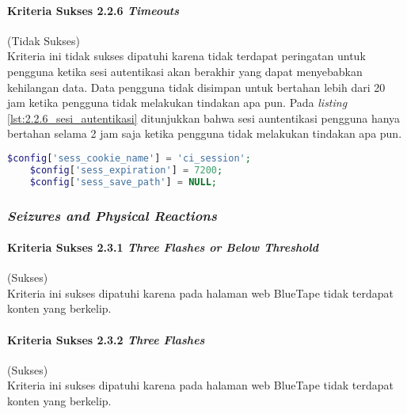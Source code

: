 \paragraph{Kriteria Sukses 2.2.6 \textit{Timeouts}}
\label{par:kepatuhan_bluetape_kriteria_sukses_2.2.6}
(Tidak Sukses)\\

Kriteria ini tidak sukses dipatuhi karena tidak terdapat peringatan untuk pengguna ketika sesi autentikasi akan berakhir yang dapat menyebabkan kehilangan data. Data pengguna tidak disimpan untuk bertahan lebih dari 20 jam ketika pengguna tidak melakukan tindakan apa pun. Pada \textit{listing} \ref{lst:2.2.6_sesi_autentikasi} ditunjukkan bahwa sesi auntentikasi pengguna hanya bertahan selama 2 jam saja ketika pengguna tidak melakukan tindakan apa pun.

\begin{lstlisting}[frame=single, label={lst:2.2.6_sesi_autentikasi}, language=PHP, caption=Pelanggaran Kriteria Sukses 2.2.6 pada Bagian Sesi Autentikasi]
    $config['sess_cookie_name'] = 'ci_session';
    $config['sess_expiration'] = 7200;
    $config['sess_save_path'] = NULL;
\end{lstlisting}

\subsubsection{\textit{Seizures and Physical Reactions}}
\label{subsubsec:kepatuhan_bluetape_seizures_and_physical_reactions}

\paragraph{Kriteria Sukses 2.3.1 \textit{Three Flashes or Below Threshold}}
\label{par:kepatuhan_bluetape_kriteria_sukses_2.3.1}
(Sukses)\\

Kriteria ini sukses dipatuhi karena pada halaman web BlueTape tidak terdapat konten yang berkelip.

\paragraph{Kriteria Sukses 2.3.2 \textit{Three Flashes}}
\label{par:kepatuhan_bluetape_kriteria_sukses_2.3.2}
(Sukses)\\

Kriteria ini sukses dipatuhi karena pada halaman web BlueTape tidak terdapat konten yang berkelip.


